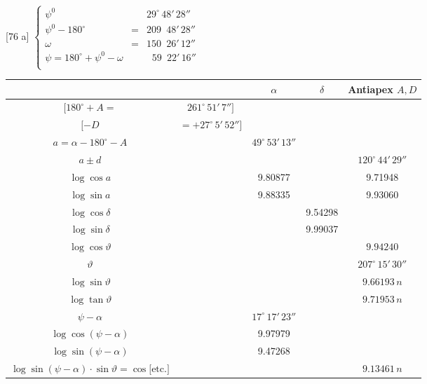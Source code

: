 \documentclass[12pt,a4paper]{article}
\theoremstyle{plain}
\theoremstyle{definition}
\theoremstyle{remark}
\begin{document}
\begin{small}
[Rechnungsbeispiel: \textsc{Br.}~No.~3128 $= $ \AA bo No.~550 ($\alpha$ Aurigae\textsuperscript{***}):]

[76 a] $\left\{\begin{array}{rcl}
\psi^{0} & & 29^{\circ}\,48'\,28'' \\
\psi^{0} - 180^{\circ} & = & 209\phantom{^{\circ}}\,48'\,28'' \\
\omega & = & 150\phantom{^{\circ}}\,26'\,12'' \\
\psi = 180^{\circ} + \psi^{0} - \omega & & \;\; 59\phantom{^{\circ}}\,22'\,16'' \\
\end{array}\right.$

\begin{center}
\begin{tabular}{c|c|c|c|c}
& & $\alpha$ & $\delta$ & Antiapex $A, D$ \\
\hline
$[180^{\circ} + A =$ & $261^{\circ}\,51'\,7'']$ & & & \\
$[-D$ & $= +27^{\circ}\,5'\,52'']$ & & & \\
\hline
$a = \alpha - 180^{\circ} - A$ & & $49^{\circ}\,53'\,13''$ & & \\
$a \pm d$ & & & & $120^{\circ}\,44'\,29''$ \\
\hline
$\log\cos a$ & & 9.80877 & & 9.71948 \\
$\log\sin a$ & & 9.88335 & & 9.93060 \\
$\log\cos\delta$ & & & 9.54298 & \\
$\log\sin\delta$ & & & 9.99037 & \\
$\log\cos\vartheta$ & & & & $9.94240$ \\
$\vartheta$ & & & & $207^{\circ}\,15'\,30''$ \\
\hline
$\log\sin\vartheta$ & & & & $9.66193\,n$ \\
$\log\tan\vartheta$ & & & & $9.71953\,n$ \\
\hline
$\psi - \alpha$ & & $17^{\circ}\,17'\,23''$ & & \\
$\log\cos(\psi - \alpha)$ & & 9.97979 & & \\
$\log\sin(\psi - \alpha)$ & & 9.47268 & & \\
\hline
$\log\sin(\psi - \alpha)\cdot\sin\vartheta = \cos\text{[etc.]}$ & & & & $9.13461\,n$ \\
\end{tabular}
\end{center}
\end{small}
\end{document}
